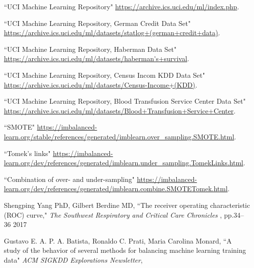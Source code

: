 \begin{thebibliography}{99}%

``UCI Machine Learning Repository" \url{https://archive.ics.uci.edu/ml/index.php}.

``UCI Machine Learning Repository, German Credit Data Set" \url{https://archive.ics.uci.edu/ml/datasets/statlog+(german+credit+data)}.

``UCI Machine Learning Repository, Haberman Data Set" \url{https://archive.ics.uci.edu/ml/datasets/haberman's+survival}.

``UCI Machine Learning Repository, Census Incom KDD Data Set" \url{https://archive.ics.uci.edu/ml/datasets/Census-Income+(KDD)}.

``UCI Machine Learning Repository, Blood Transfusion Service Center Data Set" \url{https://archive.ics.uci.edu/ml/datasets/Blood+Transfusion+Service+Center}.

``SMOTE" \url{https://imbalanced-learn.org/stable/references/generated/imblearn.over_sampling.SMOTE.html}.

``Tomek’s links" \url{https://imbalanced-learn.org/dev/references/generated/imblearn.under_sampling.TomekLinks.html}.

``Combination of over- and under-sampling" \url{https://imbalanced-learn.org/dev/references/generated/imblearn.combine.SMOTETomek.html}.

Shengping Yang PhD,
Gilbert Berdine MD,
``The receiver operating characteristic (ROC) curve," {\it The Southwest Respiratory and Critical Care Chronicles }, pp.34–36 2017

\bibitem{}
Gustavo E. A. P. A. Batista,
Ronaldo C. Prati,
Maria Carolina Monard,
``A study of the behavior of several methods for balancing machine learning training data" {\it ACM SIGKDD Explorations Newsletter},

\end{thebibliography}
